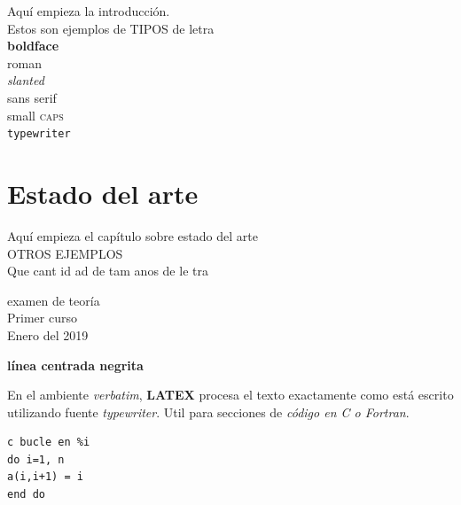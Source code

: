 \documentclass[a4paper,12pt]{article}
\begin{document}

Aqu\'i empieza la introducci\'on.\\
Estos son ejemplos de TIPOS de letra \\
{\bf bold}\textbf{face}\\
{\rm ro}\textrm{man}\\
{\sl slan}\textsl{ted}\\
{\sf sans} \textsf{serif}\\
{\sc small} \textsc{caps}\\
{\tt type}\texttt{writer}\\
\chapter{Estado del arte}
Aqu\'i empieza el cap\'itulo sobre estado del arte\\
OTROS EJEMPLOS \\
{\tiny Que} {\scriptsize cant} {\footnotesize id} {\small ad} {\normalsize de} {\large tam} {\Large anos} {\LARGE de} {\huge le} {\Huge tra}

\begin{center}
\huge{examen de teoría} \\
\bigskip
Primer curso \\
Enero del 2019
\end{center}

\centerline{\bf línea centrada negrita}

En el ambiente \textit{verbatim}, \textbf{LATEX} procesa el texto exactamente como está escrito utilizando fuente \textit{typewriter}. Util para secciones de \textit{código en C o Fortran}.

\begin{verbatim}
c bucle en %i
do i=1, n
a(i,i+1) = i
end do
\end{verbatim}
\end{document}
